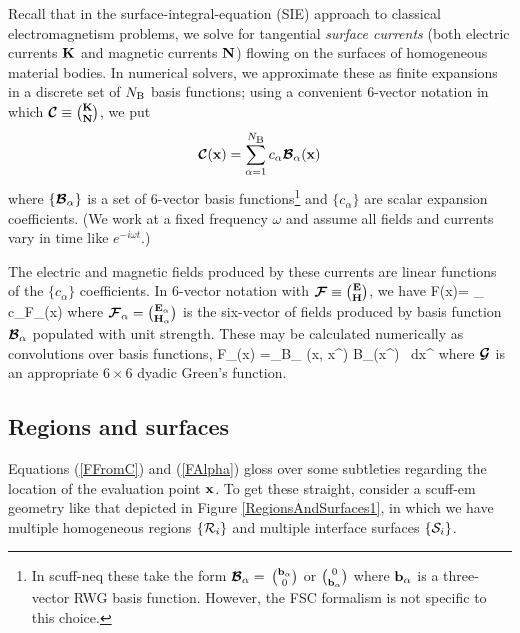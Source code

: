 \documentclass[letterpaper]{article}
\begin{document}
Recall that in the surface-integral-equation (SIE) approach to
classical electromagnetism problems, we solve for tangential
\textit{surface currents} (both electric currents $\mathbf{K}$ 
and magnetic currents $\mathbf{N}$) flowing on the surfaces of 
homogeneous material bodies. In numerical solvers, we 
approximate these as finite expansions in a discrete set
of $N_{\text{\scriptsize B}}$ basis functions; using a convenient 6-vector notation 
in which $\boldsymbol{\mathcal{C}}\equiv {\mathbf{K} \choose \mathbf{N}}$, we put
$$ \boldsymbol{\mathcal{C}}(\mathbf{x})=\sum_{\alpha=1}^{N_{\text{\scriptsize B}}} 
   c_\alpha \boldsymbol{\mathcal{B}}_\alpha(\mathbf{x}) 
$$ 
where $\{\boldsymbol{\mathcal{B}}_\alpha\}$ is a set of 6-vector basis 
functions\footnote{In {\sc scuff-neq} these take the form
$\boldsymbol{\mathcal{B}}_\alpha=$ 
$\mathbf{b}_\alpha \choose 0$ 
or 
$0 \choose \mathbf{b}_\alpha$
where $\mathbf{b}_\alpha$ is a three-vector RWG basis function.
However, the FSC formalism is not specific to this choice.}
and $\{c_\alpha\}$ are scalar expansion coefficients.
(We work at a fixed frequency $\omega$ and assume all fields
and currents vary in time like $e^{-i\omega t}$.)

The electric and magnetic fields produced by these currents
are linear functions of the $\{c_\alpha\}$ coefficients.
In 6-vector notation with $\boldsymbol{\mathcal{F}}\equiv {\mathbf{E} \choose \mathbf{H}}$, we have
{ \bmc F(\vb x)=
   \sum_{\alpha} c_\alpha \bmc F_\alpha(\vb x)
}
where $\boldsymbol{\mathcal{F}}_\alpha={\mathbf{E}_\alpha \choose \mathbf{H}_\alpha}$ 
is the six-vector of fields produced by basis function $\boldsymbol{\mathcal{B}}_\alpha$ 
populated with unit strength. These may be calculated numerically
as convolutions over basis functions,
{
  \bmc F_\alpha(\vb x)
   =\int_{\sup \bmc B_\alpha} (\vb x, \vb x^\prime)
    \bmc B_\alpha(\vb x^\prime) \, d\vb x^\prime
}
where $\boldsymbol{\mathcal{G}}$ is an appropriate $6\times 6$ dyadic Green's
function.

\subsection*{Regions and surfaces}

Equations (\ref{FFromC}) and (\ref{FAlpha}) gloss over
some subtleties regarding the location of the evaluation
point $\mathbf{x}$. To get these straight, consider
a {\sc scuff-em} geometry like that depicted
in Figure \ref{RegionsAndSurfaces1}, in which we 
have multiple homogeneous regions $\{\mathcal{R}_i\}$
and multiple interface surfaces $\{\mathcal{S}_i\}$.
\end{document}
